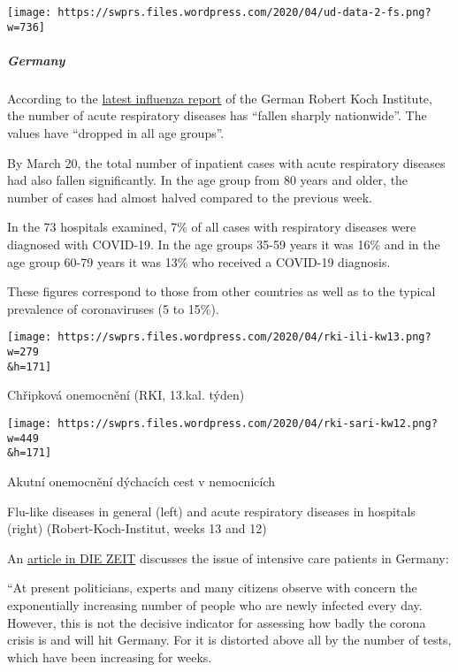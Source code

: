 \texttt{[image: https://swprs.files.wordpress.com/2020/04/ud-data-2-fs.png?w=736]}

\hypertarget{germany}{%
\subparagraph{\texorpdfstring{\textbf{Germany}}{Germany}}\label{germany}}

According to the
\href{https://influenza.rki.de/Wochenberichte/2019_2020/2020-13.pdf}{latest
influenza report} of the German Robert Koch Institute, the number of
acute respiratory diseases has ``fallen sharply nationwide''. The values
have ``dropped in all age groups''.

By March 20, the total number of inpatient cases with acute respiratory
diseases had also fallen significantly. In the age group from 80 years
and older, the number of cases had almost halved compared to the
previous week.

In the 73 hospitals examined, 7\% of all cases with respiratory diseases
were diagnosed with COVID-19. In the age groups 35-59 years it was 16\%
and in the age group 60-79 years it was 13\% who received a COVID-19
diagnosis.

These figures correspond to those from other countries as well as to the
typical prevalence of coronaviruses (5 to 15\%).

\href{https://swprs.files.wordpress.com/2020/04/rki-ili-kw13.png}{}

\texttt{[image: https://swprs.files.wordpress.com/2020/04/rki-ili-kw13.png?w=279\\\&h=171]}

Chřipková onemocnění (RKI, 13.kal. týden)

\href{https://swprs.files.wordpress.com/2020/04/rki-sari-kw12.png}{}

\texttt{[image: https://swprs.files.wordpress.com/2020/04/rki-sari-kw12.png?w=449\\\&h=171]}

Akutní onemocnění dýchacích cest v nemocnicích

Flu-like diseases in general (left) and acute respiratory diseases in
hospitals (right) (Robert-Koch-Institut, weeks 13 and 12)

An
\href{https://www.zeit.de/wissen/2020-04/krankenhaeuser-kapazitaeten-coronavirus-patienten-deutschland/seite-2}{article
in DIE ZEIT} discusses the issue of intensive care patients in Germany:

``At present politicians, experts and many citizens observe with concern
the exponentially increasing number of people who are newly infected
every day. However, this is not the decisive indicator for assessing how
badly the corona crisis is and will hit Germany. For it is distorted
above all by the number of tests, which have been increasing for weeks.

